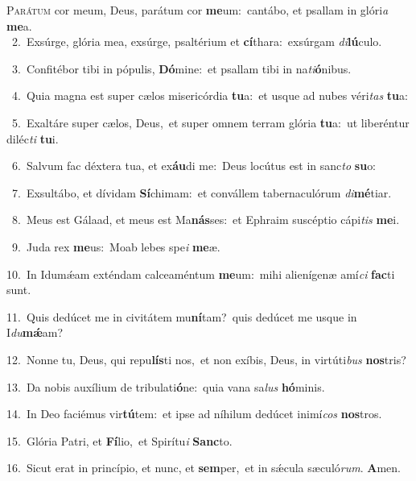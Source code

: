 \lettrine{\initial\textcolor{\initialcolor}{P}}{arátum} cor meum, Deus, parátum cor \textbf{me}\-um:~\star cantábo, et psallam in glóri\textit{a} \textbf{me}\-a.\\
{\numbfont\textcolor{\numbcolor}{~2.}}~Exsúrge, glória mea, exsúrge, psaltérium et \textbf{cí}\-thara:~\star exsúrgam \textit{di}\-\textbf{lú}culo.\par
{\numbfont\textcolor{\numbcolor}{~3.}}~Confitébor tibi in pópulis, \textbf{Dó}\-mine:~\star et psallam tibi in na\-\textit{ti}\-\textbf{ó}nibus.\par
{\numbfont\textcolor{\numbcolor}{~4.}}~Quia magna est super cælos misericórdia \textbf{tu}\-a:~\star et usque ad nubes véri\textit{tas} \textbf{tu}\-a:\par
{\numbfont\textcolor{\numbcolor}{~5.}}~Exaltáre super cælos, Deus,~\dagger et super omnem terram glória \textbf{tu}\-a:~\star ut liberéntur diléc\textit{ti} \textbf{tu}\-i.\par
{\numbfont\textcolor{\numbcolor}{~6.}}~Salvum fac déxtera tua, et ex\-\textbf{áu}\-di me:~\star Deus locútus est in sanc\textit{to} \textbf{su}\-o:\par
{\numbfont\textcolor{\numbcolor}{~7.}}~Exsultábo, et dívidam \textbf{Sí}\-chimam:~\star et convállem tabernaculórum \textit{di}\-\textbf{mé}tiar.\par
{\numbfont\textcolor{\numbcolor}{~8.}}~Meus est Gálaad, et meus est Ma\-\textbf{nás}\-ses:~\star et Ephraim suscéptio cápi\textit{tis} \textbf{me}\-i.\par
{\numbfont\textcolor{\numbcolor}{~9.}}~Juda rex \textbf{me}\-us:~\star Moab lebes spe\textit{i} \textbf{me}\-æ.\par
{\numbfont\textcolor{\numbcolor}{10.}}~In Idumǽam exténdam calceaméntum \textbf{me}\-um:~\star mihi alienígenæ amí\textit{ci} \textbf{fac}\-ti sunt.\par
{\numbfont\textcolor{\numbcolor}{11.}}~Quis dedúcet me in civitátem mu\-\textbf{ní}\-tam?~\star quis dedúcet me usque in I\-\textit{du}\-\textbf{mǽ}am?\par
{\numbfont\textcolor{\numbcolor}{12.}}~Nonne tu, Deus, qui repu\-\textbf{lís}\-ti nos,~\star et non exíbis, Deus, in virtúti\textit{bus} \textbf{nos}\-tris?\par
{\numbfont\textcolor{\numbcolor}{13.}}~Da nobis auxílium de tribulati\-\textbf{ó}\-ne:~\star quia vana sa\textit{lus} \textbf{hó}\-minis.\par
{\numbfont\textcolor{\numbcolor}{14.}}~In Deo faciémus vir\-\textbf{tú}\-tem:~\star et ipse ad níhilum dedúcet inimí\textit{cos} \textbf{nos}\-tros.\par
{\numbfont\textcolor{\numbcolor}{15.}}~Glória Patri, et \textbf{Fí}\-lio,~\star et Spirítu\textit{i} \textbf{Sanc}\-to.\par
{\numbfont\textcolor{\numbcolor}{16.}}~Sicut erat in princípio, et nunc, et \textbf{sem}\-per,~\star et in sǽcula sæculó\-\textit{rum}\-. \textbf{A}\-men.\par
